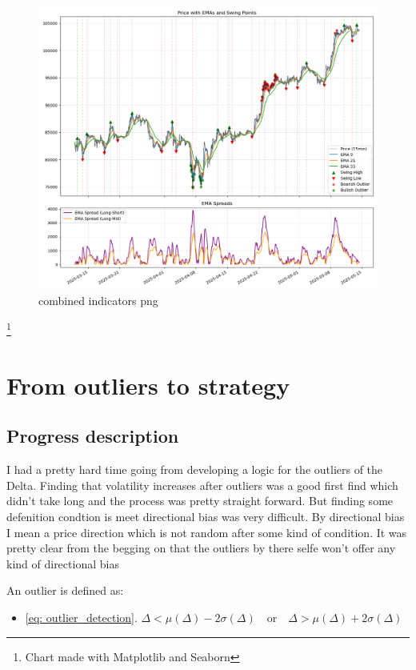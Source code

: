 \documentclass[12pt]{article}
\begin{document}
\begin{figure}[H]
    \centering
    \includegraphics[width=\textwidth]{imgs/swingpoints_emaspread_priceOutliers.png}
    \caption{combined indicators png}
\end{figure}

\footnote{Chart made with Matplotlib and Seaborn}






\newpage
\section{From outliers to strategy}
\subsection{Progress description}
I had a pretty hard time going from developing a logic for the outliers of the Delta. Finding that volatility increases after outliers was a good first find which didn't take long and the process was pretty straight forward. But finding some defenition condtion is meet directional bias was very difficult. By directional bias I mean a price direction which is not random after some kind of condition. It was pretty clear from the begging on that the outliers by there selfe won't offer any kind of directional bias


An outlier is defined as:

\begin{itemize}
  \item \eqref{eq: outlier_detection}.
  $\Delta < \mu(\Delta) - 2\sigma(\Delta) \quad \text{or} \quad \Delta > \mu(\Delta) + 2\sigma(\Delta)    $
\end{itemize}
\end{document}
